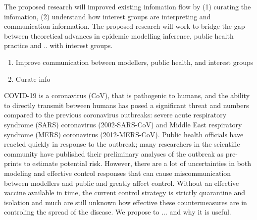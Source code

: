 The proposed research will improved existing infomation flow by (1) curating the infomation, (2) understand how interest groups are interpreting and communication information. 
The proposed research will work to bridge the gap between theoretical advances in epidemic modelling inference, public health practice and .. with interest groups. 

\begin{enumerate}
\item{Improve communication between modellers, public health, and interest groups}
\item{Curate info}
\end{enumerate}


COVID-19 is a coronavirus (CoV), that is pathogenic to humans, and the ability to directly transmit between humans has posed a significant threat and numbers compared to the previous coronavirus outbreaks: severe acute respiratory syndrome (SARS) coronavirus (2002-SARS-CoV) and Middle East respiratory syndrome (MERS) coronavirus (2012-MERS-CoV). 
Public health officials have reacted quickly in response to the outbreak; many researchers in the scientific community have published their preliminary analyses of the outbreak as pre-prints to estimate potential risk. 
However, there are a lot of uncertainties in both modeling and effective control responses that can cause miscommunication between modellers and public and greatly affect control.   
Without an effective vaccine available in time, the current control strategy is strictly quarantine and isolation and much are still unknown how effective these countermeasures are in controling the spread of the disease.  
We propose to ... and why it is useful. 







